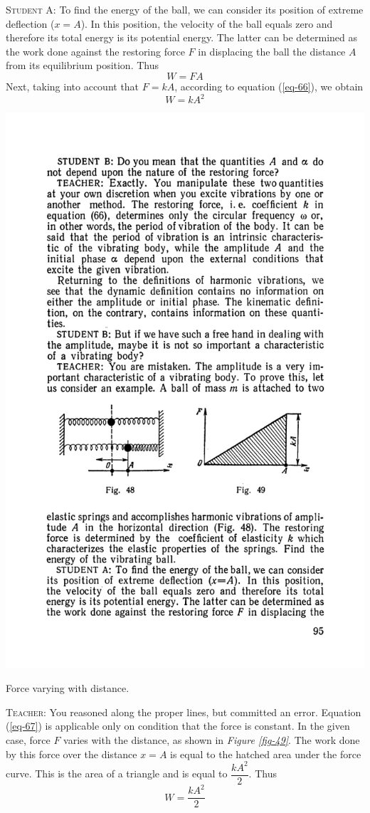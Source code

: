 \documentclass[a4paper,sfsidenotes]{tufte-book}
\begin{document}
\textsc{Student A:} To find the energy of the ball, we can consider its position of extreme deflection ($x = A$). In this position, the velocity of the ball equals zero and therefore its total energy is its potential energy. The latter can be determined as the work done against the restoring force $F$ in displacing the
ball the distance $A$ from its equilibrium position. Thus
\\
\begin{equation}
W = FA
\label{eq-67}
\end{equation}
Next, taking into account that $F=kA$, according to equation (\ref{eq-66}), we obtain
\\
\begin{equation*}
W=kA^{2}
\end{equation*}

\begin{marginfigure}
\centering
\includegraphics[width=0.8\linewidth]{fig-049a.pdf}
\caption{Force varying with distance.}
\label{fig-49}
\end{marginfigure}
\textsc{Teacher:} You reasoned along the proper lines, but committed an error. Equation (\ref{eq-67}) is applicable only on condition that the force is constant. In the given case, force $F$ varies with the distance, as shown in \emph{Figure \ref{fig-49}}. The work done by this force over the distance $x=A$ is equal to the hatched area under the force curve. This is the area of a triangle and is equal to
$\dfrac{kA^{2}}{2}$. Thus\\
\begin{equation}
W = \frac{kA^{2}}{2}
\label{eq-68}
\end{equation}
\end{document}
